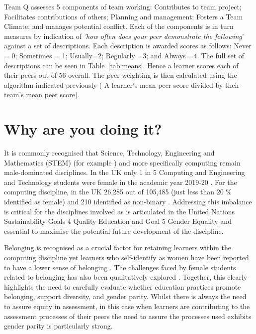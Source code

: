 \documentclass[sigconf, anonymous=true]{acmart}
\begin{document}
Team Q \cite{Britton2017} assesses 5 components of team working: Contributes to team project; Facilitates contributions of others; Planning and management; Fosters a Team Climate; and manages potential conflict. Each of the components is in turn measures by indication of \textit{'how often does your peer demonstrate the following}' against a set of descriptions. Each description is awarded scores as follows: Never = 0; Sometimes = 1; Usually=2; Regularly =3; and Always =4. The full set of descriptions can be seen in Table~\ref{tab:means}.  Hence a learner scores each of their peers out of 56 overall. The peer weighting is then calculated using the algorithm indicated previously ( A learner's mean peer score divided by their team's mean peer score).

\section{Why are you doing it?}
It is commonly recognised that Science, Technology, Engineering and Mathematics (STEM) (for example \cite{Baird2018}) and more specifically computing remain male-dominated disciplines. In the UK only 1 in 5 Computing and Engineering and Technology students were female in the academic year 2019-20 \cite{HESA}. For the computing discipline, in the UK 26,285 out of 105,485 (just less than 20 \% identified as female) and 210 identified as non-binary \cite{HESA}. Addressing this imbalance is critical for the disciplines involved as is articulated in the United Nations Sustainability Goals 4 Quality Education and Goal 5 Gender Equality \cite{UN} and essential to maximise the potential future development of the discipline.

Belonging \cite{Veilleux2013} is recognised as a crucial factor for retaining learners within the computing discipline yet learners who self-identify as women have been reported to have a lower sense of belonging \cite{Mooney2020}. The challenges faced by female students related to belonging has also been qualitatively explored \cite{Winter2021}. Together, this clearly highlights the need to carefully evaluate whether education practices promote belonging, support diversity, and gender parity. Whilst there is always the need to assure equity in assessment, in this case when learners are contributing to the assessment processes of their peers the need to assure the processes used exhibits gender parity is particularly strong. 
\end{document}
